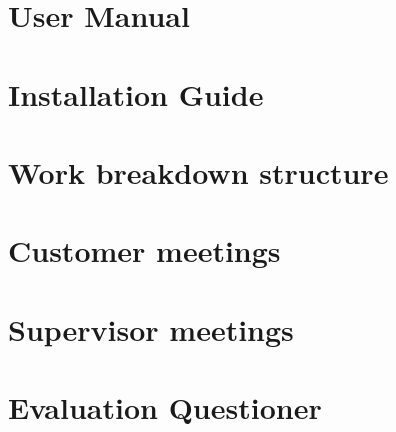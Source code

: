 \chapter{User Manual}

\chapter{Installation Guide}

\chapter{Work breakdown structure}

\chapter{Customer meetings}

\chapter{Supervisor meetings}

\chapter{Evaluation Questioner}